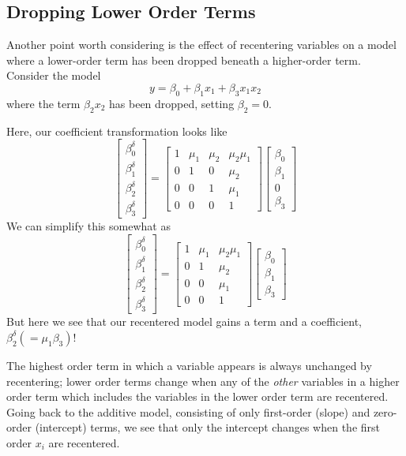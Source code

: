 \documentclass[]{article}
\begin{document}
\hypertarget{dropping-lower-order-terms}{%
\subsection{Dropping Lower Order
Terms}\label{dropping-lower-order-terms}}

Another point worth considering is the effect of recentering variables
on a model where a lower-order term has been dropped beneath a
higher-order term. Consider the model
\[y = \beta_0 + \beta_1x_1 + \beta_3x_1x_2\] where the term
\(\beta_2x_2\) has been dropped, setting \(\beta_2=0\).

Here, our coefficient transformation looks like
\[\begin{bmatrix}\beta_0^\delta \\ \beta_1^\delta \\ \beta_2^\delta \\ \beta_3^\delta \end{bmatrix}=
\begin{bmatrix} 1 & \mu_1 &\mu_2 &\mu_2\mu_1 \\
  0 &1 &0 &\mu_2 \\ 0 &0 &1 &\mu_1 \\ 0 &0 &0 &1 \end{bmatrix}
\begin{bmatrix}\beta_0 \\ \beta_1 \\ 0 \\ \beta_3 \end{bmatrix}\] We can
simplify this somewhat as
\[\begin{bmatrix}\beta_0^\delta \\ \beta_1^\delta \\ \beta_2^\delta \\ \beta_3^\delta \end{bmatrix}=
\begin{bmatrix} 1 & \mu_1 &\mu_2\mu_1 \\
  0 &1 &\mu_2 \\ 0 &0 &\mu_1 \\ 0 &0 &1 \end{bmatrix}
\begin{bmatrix}\beta_0 \\ \beta_1 \\ \beta_3 \end{bmatrix}\] But here we
see that our recentered model gains a term and a coefficient,
\(\beta_2^\delta (=\mu_1\beta_3)\)!

The highest order term in which a variable appears is always unchanged
by recentering; lower order terms change when any of the \emph{other}
variables in a higher order term which includes the variables in the
lower order term are recentered. Going back to the additive model,
consisting of only first-order (slope) and zero-order (intercept) terms,
we see that only the intercept changes when the first order \(x_i\) are
recentered.
\end{document}
